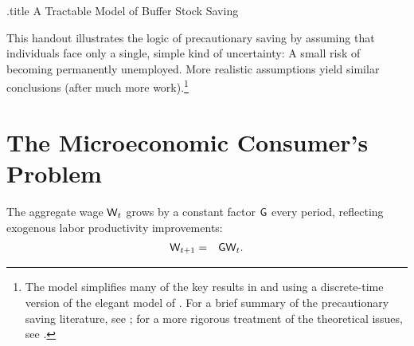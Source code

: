 \message{ !name(TractableBufferStock.tex)}\documentclass{handout}
\begin{document}

\handoutHeader
\providecommand{\dmEqZero}{\ensuremath{\Delta\mRatE=0}}
\providecommand{\dcEqZero}{\ensuremath{\Delta\cRatE=0}}



\begin{verbatimwrite}{\jobname.title}
A Tractable Model of Buffer Stock Saving
\end{verbatimwrite}

\handoutNameMake


This handout illustrates the logic of precautionary saving by assuming
that individuals face only a single, simple kind of uncertainty: A small risk of becoming permanently unemployed.  More realistic assumptions yield similar conclusions (after much more work).\footnote{The model simplifies many of the key results in \cite{carroll:brookings} and \cite{carroll:bslcpih} using a  discrete-time version of the elegant model of \cite{toche:urisk}.
  For a brief summary of the precautionary saving literature, see
  \cite{CarrollKimballPSPW}; for a more rigorous   treatment of the theoretical issues, see \cite{carrollBSTheory}.}

\section{The Microeconomic Consumer's Problem}
The aggregate wage $\mathsf{W}_{t}$ grows
by a constant factor $\mathsf{G}$ every period, reflecting exogenous labor productivity improvements:
\begin{eqnarray}
        \mathsf{W}_{t+1} & = & \mathsf{G} \mathsf{W}_{t}.
\end{eqnarray}
\end{document}
